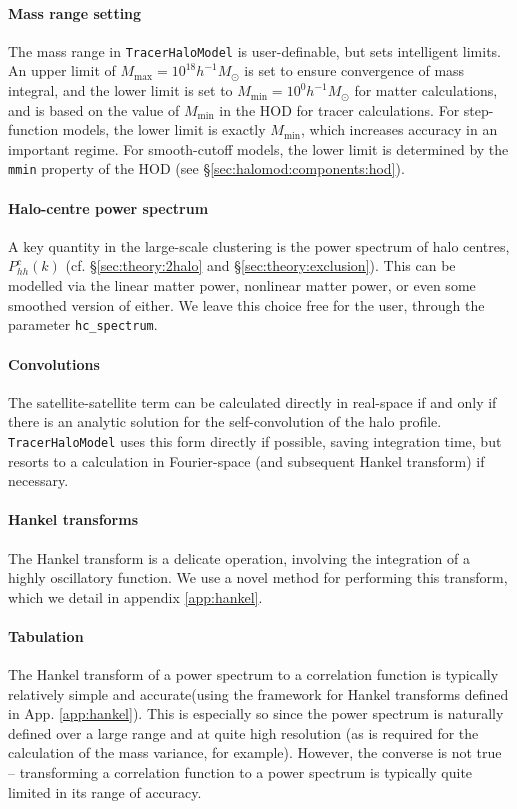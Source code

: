 \documentclass[5p]{elsarticle}
\begin{document}
\paragraph*{Mass range setting}
The mass range in \verb|TracerHaloModel| is user-definable, but sets intelligent limits. An upper limit of $M_\text{max} = 10^{18}h^{-1}M_\odot$ is set to ensure convergence of mass integral, and the lower limit is set to $M_\text{min} = 10^{0}h^{-1}M_\odot$ for matter calculations, and is based on the value of $M_\text{min}$ in the HOD for tracer calculations. For step-function models, the lower limit is exactly $M_\text{min}$, which increases accuracy in an important regime. For smooth-cutoff models, the lower limit is determined by the \verb|mmin| property of the HOD (see \S\ref{sec:halomod:components:hod}).

\paragraph*{Halo-centre power spectrum}
A key quantity in the large-scale clustering is the power spectrum of halo centres, $P_{hh}^c(k)$ (cf. \S\ref{sec:theory:2halo} and \S\ref{sec:theory:exclusion}). This can be modelled via the linear matter power, nonlinear matter power, or even some smoothed version of either. We leave this choice free for the user, through the parameter \verb|hc_spectrum|. 

\paragraph*{Convolutions}
The satellite-satellite term can be calculated directly in real-space if and only if there is an analytic solution for the self-convolution of the halo profile. \verb|TracerHaloModel| uses this form directly if possible, saving integration time, but resorts to a calculation in Fourier-space (and subsequent Hankel transform) if necessary. 

\paragraph*{Hankel transforms} 
The Hankel transform is a delicate operation, involving the integration of a highly oscillatory function. We use a novel method for performing this transform, which we detail in appendix \ref{app:hankel}.

\paragraph*{Tabulation}
The Hankel transform of a power spectrum to a correlation function is typically relatively simple and accurate(using the framework for Hankel transforms defined in App. \ref{app:hankel}).
This is especially so since the power spectrum is naturally defined over a large range and at quite high resolution (as is required for the calculation of the mass variance, for example). 
However, the converse is not true -- transforming a correlation function to a power spectrum is typically quite limited in its range of accuracy. 
\end{document}
